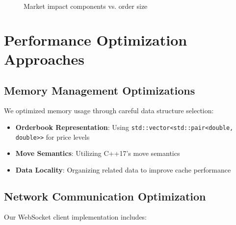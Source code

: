 \documentclass[10pt,twocolumn,a4paper]{IEEEtran}
\begin{document}
\begin{figure}[t]
    \centering
    \caption{Market impact components vs. order size}
    \label{fig:impact_curves}
\end{figure}

\section{Performance Optimization Approaches}

\subsection{Memory Management Optimizations}

We optimized memory usage through careful data structure selection:

\begin{itemize}
    \item \textbf{Orderbook Representation}: Using \texttt{std::vector<std::pair<double, double>>} for price levels
    \item \textbf{Move Semantics}: Utilizing C++17's move semantics
    \item \textbf{Data Locality}: Organizing related data to improve cache performance
\end{itemize}

\subsection{Network Communication Optimization}

Our WebSocket client implementation includes:
\end{document}
